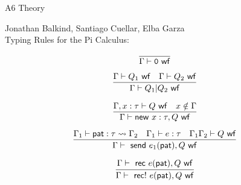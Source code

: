 \documentclass[10pt, letterpaper,proof]{letter}
\begin{document}
A6 Theory

Jonathan Balkind, Santiago Cuellar, Elba Garza\\

Typing Rules for the Pi Calculus:


\[\infer[]{\Gamma \vdash \mathtt{0} \ \mathsf{ wf}}{}\]

\[\infer[]{\Gamma \vdash Q_1 | Q_2 \ \mathsf{ wf}}{\Gamma \vdash Q_1 \ \mathsf{ wf} & \Gamma \vdash Q_2 \ \mathsf{ wf}}\]

\[\infer[]{\Gamma \vdash \mathsf{new}\ x:\tau, Q\ \mathsf{ wf}}{\Gamma, x:\tau \vdash Q \ \mathsf{ wf} & x \notin \Gamma}\]

\[\infer[]{\Gamma \vdash \ \mathsf{send}\ e_1(\mathsf{pat}),Q \ \mathsf{ wf}}{\Gamma_1 \vdash \mathsf{pat}:\tau \leadsto \Gamma_2 & \Gamma_1 \vdash e:\tau & \Gamma_1\Gamma_2 \vdash Q \ \mathsf{ wf}}\]

\[\infer[]{\Gamma \vdash \ \mathsf{rec}!\ e(\mathsf{pat}),Q \ \mathsf{ wf}}{\Gamma \vdash \ \mathsf{rec}\ e(\mathsf{pat}),Q \ \mathsf{ wf}}\]
\end{document}

